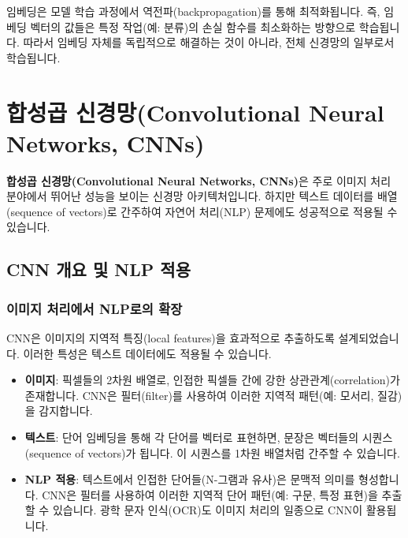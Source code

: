 \documentclass[11pt,a4paper]{article}
\theoremstyle{definition}
\begin{document}
\begin{tcolorbox}[warningbox, title=\textbf{주의}]
임베딩은 모델 학습 과정에서 역전파(backpropagation)를 통해 최적화됩니다. 즉, 임베딩 벡터의 값들은 특정 작업(예: 분류)의 손실 함수를 최소화하는 방향으로 학습됩니다. 따라서 임베딩 자체를 독립적으로 해결하는 것이 아니라, 전체 신경망의 일부로서 학습됩니다.
\end{tcolorbox}

\newpage
\section{합성곱 신경망(Convolutional Neural Networks, CNNs)}

\begin{tcolorbox}[conceptbox, title=\textbf{핵심 개념}]
\textbf{합성곱 신경망(Convolutional Neural Networks, CNNs)}은 주로 이미지 처리 분야에서 뛰어난 성능을 보이는 신경망 아키텍처입니다. 하지만 텍스트 데이터를 배열(sequence of vectors)로 간주하여 자연어 처리(NLP) 문제에도 성공적으로 적용될 수 있습니다.
\end{tcolorbox}

\subsection{CNN 개요 및 NLP 적용}

\subsubsection{이미지 처리에서 NLP로의 확장}
CNN은 이미지의 지역적 특징(local features)을 효과적으로 추출하도록 설계되었습니다. 이러한 특성은 텍스트 데이터에도 적용될 수 있습니다.

\begin{itemize}
    \item \textbf{이미지}: 픽셀들의 2차원 배열로, 인접한 픽셀들 간에 강한 상관관계(correlation)가 존재합니다. CNN은 필터(filter)를 사용하여 이러한 지역적 패턴(예: 모서리, 질감)을 감지합니다.
    \item \textbf{텍스트}: 단어 임베딩을 통해 각 단어를 벡터로 표현하면, 문장은 벡터들의 시퀀스(sequence of vectors)가 됩니다. 이 시퀀스를 1차원 배열처럼 간주할 수 있습니다.
    \item \textbf{NLP 적용}: 텍스트에서 인접한 단어들(N-그램과 유사)은 문맥적 의미를 형성합니다. CNN은 필터를 사용하여 이러한 지역적 단어 패턴(예: 구문, 특정 표현)을 추출할 수 있습니다. 광학 문자 인식(OCR)도 이미지 처리의 일종으로 CNN이 활용됩니다.
\end{itemize}
\end{document}
